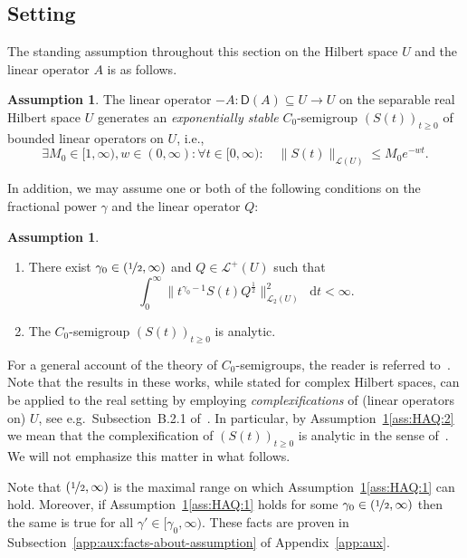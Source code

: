 \documentclass[reqno]{amsart}
\numberwithin{equation}{section}
\newcommand{\norm}[2]{     \| #1       \|_{ #2 }}
\newcommand{\rd}{\mathop{}\!\mathrm{d}}
\newcommand{\from}{\colon}
\theoremstyle{remark}
\theoremstyle{definition}
\newtheorem{assumption}[lemma]{Assumption}
\begin{document}
\subsection{Setting}
\label{subsec:fractional-int-diff:setting}
The standing assumption throughout this section on the Hilbert space $U$
and the linear operator $A$ is as follows.

%
\begin{assumption}\label{ass:standing}
	The linear operator
	$-A \from \mathsf D(A) \subseteq U \to U$
	on the separable real Hilbert space $U$ generates an
	\emph{exponentially stable} $C_0$-semigroup $(S(t))_{t\ge0}$ of bounded
	linear operators on $U$, i.e.,
	\begin{equation}\label{eq:semigroup-est}
		\exists M_0 \in [1,\infty), w \in (0, \infty) : \forall t \in [0,\infty) : \quad
		\norm{S(t)}{\mathscr L(U)} \le M_0 e^{-wt}.
	\end{equation}
\end{assumption}
%
In addition, we may assume one or both of the following conditions
on the fractional power $\gamma$ and the linear operator $Q$:
%
\begin{assumption}\label{ass:HAQ}
	$\,$
	\begin{enumerate}[leftmargin=1cm]
		\item \label{ass:HAQ:1}
		There exist $\gamma_0 \in (\nicefrac{1}{2}, \infty)$ and $Q \in \mathscr L^+(U)$ such that
		\[
		\int_0^\infty \| t^{\gamma_0-1} S(t) Q^\frac{1}{2} \|_{\mathscr L_2(U)}^2 \rd t < \infty.
		\]
		\item \label{ass:HAQ:2}
		The $C_0$-semigroup
		$(S(t))_{t\ge0}$ is analytic.
	\end{enumerate}
\end{assumption}
%

For a general account of the theory of $C_0$-semigroups, the reader
is referred to~\cite{Engel1999, Pazy1983}. 
Note that the results in these works, while stated for
complex Hilbert spaces, can be applied to the real setting by employing \emph{complexifications}
of (linear operators on) $U$, see e.g.\ Subsection~B.2.1 of~\cite[Appendix~B]{KW2022}.
In particular, by Assumption~\ref{ass:HAQ}\ref{ass:HAQ:2} we mean that the complexification of $(S(t))_{t\ge0}$
is analytic in the sense of~\cite[Section~2.5]{Pazy1983}.
We will not emphasize this matter in what follows.

Note that
$(\nicefrac{1}{2}, \infty)$ is the maximal range on which Assumption~\ref{ass:HAQ}\ref{ass:HAQ:1} can hold.
Moreover, if Assumption~\ref{ass:HAQ}\ref{ass:HAQ:1} holds for some $\gamma_0 \in (\nicefrac{1}{2}, \infty)$ then
the same is true for all $\gamma' \in [\gamma_0, \infty)$.
These facts are proven in Subsection~\ref{app:aux:facts-about-assumption} of Appendix~\ref{app:aux}.
\end{document}
